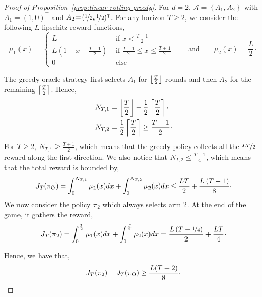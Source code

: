 \begin{proof}[Proof of Proposition~\ref{prop:linear-rotting-greedy}]
For $d\! =\! 2$, $\mathcal{A} \!=\! \left\{ A_1, A_2 \right\}$ with $A_1 \!=\! (1,0)^\intercal$ and $A_2 \!=\! (\nicefrac{1}{2},\nicefrac{1}{2})^\intercal$. For any horizon $T\geq2$, we consider the following $L$-lipschitz reward functions,
\[
\mu_1(x) = \begin{cases}
L &\text{ if } x < \frac{T-1}{2} \\
L(1- x + \frac{T-1}{2}) &\text{ if }  \frac{T-1}{2} \leq x \leq \frac{T+1}{2}\\
0 &\text{ else}
\end{cases}
\qquad \text{and} \qquad  \mu_2(x) = \frac{L}{2}\cdot
\]

The greedy oracle strategy first selects $A_1$ for $\left\lfloor\frac{T}{2}\right\rfloor$ rounds and then $A_2$ for the remaining $\left\lceil\frac{T}{2}\right\rceil$. Hence,
\begin{align*}
&N_{T,1} = \floor{\frac{T}{2}} + \frac{1}{2} \ceil{\frac{T}{2}}\CommaBin \\
&N_{T,2} = \frac{1}{2} \ceil{\frac{T}{2}} \geq \frac{T+1}{2}\cdot
\end{align*} 
For $T \geq 2$, $N_{T,1} \geq \frac{T+1}{2}$, which means that the greedy policy collects all the $\nicefrac{LT}{2}$ reward along the first direction. We also notice that $N_{T,2} \leq \frac{T+1}{4}$, which means that the total reward is bounded by, 
\[
J_T(\pi_{\rm O}) = \int_0^{N_{T,1}} \mu_1(x)dx + \int_0^{N_{T,2}} \mu_2(x)dx  \leq \frac{LT}{2} + \frac{L\left(T+1\right)}{8}\cdot
\]
We now consider the policy $\pi_2$ which always selects arm 2. At the end of the game, it gathers the reward,
\[
J_T(\pi_2) = \int_0^{\frac{T}{2}} \mu_1(x)dx + \int_0^{\frac{T}{2}} \mu_2(x)dx = \frac{L\left(T-\nicefrac{1}{4}\right) }{2} + \frac{LT}{4}\cdot
\]

Hence, we have that,
\[
J_T(\pi_2) - J_T(\pi_{\rm O}) \geq \frac{L(T-2)}{8}\cdot 
\]

\end{proof}

